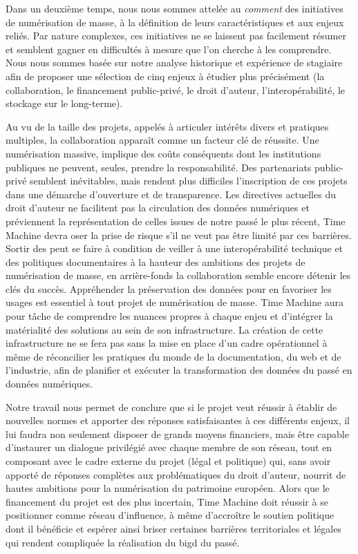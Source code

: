 Dans un deuxième temps, nous nous sommes attelée au \textit{comment} des initiatives de numérisation de masse, à la définition de leurs caractéristiques et aux enjeux reliés. Par nature complexes, ces initiatives ne se laissent pas facilement résumer et semblent gagner en difficultés à mesure que l'on cherche à les comprendre. Nous nous sommes basée sur notre analyse historique et expérience de stagiaire afin de proposer une sélection de cinq enjeux à étudier plus précisément (la collaboration, le financement public-privé, le droit d'auteur, l'interopérabilité, le stockage sur le long-terme). 

Au vu de la taille des projets, appelés à articuler intérêts divers et pratiques multiples, la collaboration apparaît comme un facteur clé de réussite. Une numérisation massive, implique des coûts conséquents dont les institutions publiques ne peuvent, seules, prendre la responsabilité. Des partenariats public-privé semblent inévitables, mais rendent plus difficiles l'inscription de ces projets dans une démarche d'ouverture et de transparence. Les directives actuelles du droit d'auteur ne facilitent pas la circulation des données numériques et préviennent la représentation de celles issues de notre passé le plus récent, Time Machine devra oser la prise de risque s'il ne veut pas être limité par ces barrières. Sortir des  peut se faire à condition de veiller à une interopérabilité technique et des politiques documentaires à la hauteur des ambitions des projets de numérisation de masse, en arrière-fonds la collaboration semble encore détenir les clés du succès. Appréhender la préservation des données pour en favoriser les usages est essentiel à tout projet de numérisation de masse. Time Machine aura pour tâche de comprendre les nuances propres à chaque enjeu et d'intégrer la matérialité des solutions au sein de son infrastructure. La création de cette infrastructure ne se fera pas sans la mise en place d'un cadre opérationnel à même de réconcilier les pratiques du monde de la documentation, du web et de l'industrie, afin de planifier et exécuter la transformation des données du passé en données numériques.

Notre travail nous permet de conclure que si le projet veut réussir à établir de nouvelles normes et apporter des réponses satisfaisantes à ces différents enjeux, il lui faudra non seulement disposer de grands moyens financiers, mais être capable d'instaurer un dialogue privilégié avec chaque membre de son réseau, tout en composant avec le cadre externe du projet (légal et politique) qui, sans avoir apporté de réponses complètes aux problématiques du droit d'auteur, nourrit de hautes ambitions pour la numérisation du patrimoine européen. Alors que le financement du projet est des plus incertain, Time Machine doit réussir à se positionner comme réseau d'influence, à même d'accroître le soutien politique dont il bénéficie et espérer ainsi briser certaines barrières territoriales et légales qui rendent compliquée la réalisation du \gls{bigd} du passé.

